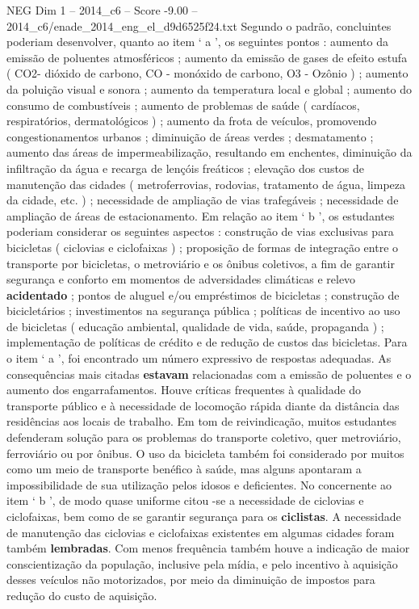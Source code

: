 \begin{textsample}{NEG Dim 1 – 2014\_c6 – Score -9.00 – 2014\_c6/enade\_2014\_eng\_el\_d9d6525f24.txt}
Segundo o padrão, concluintes poderiam desenvolver, quanto ao item ‘ a ’, os seguintes pontos : aumento da emissão de poluentes atmosféricos ; aumento da emissão de gases de efeito estufa ( CO2- dióxido de carbono, CO - monóxido de carbono, O3 - Ozônio ) ; aumento da poluição visual e sonora ; aumento da temperatura local e global ; aumento do consumo de combustíveis ; aumento de problemas de saúde ( cardíacos, respiratórios, dermatológicos ) ; aumento da frota de veículos, promovendo congestionamentos urbanos ; diminuição de áreas verdes ; desmatamento ; aumento das áreas de impermeabilização, resultando em enchentes, diminuição da infiltração da água e recarga de lençóis freáticos ; elevação dos custos de manutenção das cidades ( metroferrovias, rodovias, tratamento de água, limpeza da cidade, etc. ) ; necessidade de ampliação de vias trafegáveis ; necessidade de ampliação de áreas de estacionamento.
Em relação ao item ‘ b ’, os estudantes poderiam considerar os seguintes aspectos : construção de vias exclusivas para bicicletas ( ciclovias e ciclofaixas ) ; proposição de formas de integração entre o transporte por bicicletas, o metroviário e os ônibus coletivos, a fim de garantir segurança e conforto em momentos de adversidades climáticas e relevo \textbf{acidentado} ; pontos de aluguel e/ou empréstimos de bicicletas ; construção de bicicletários ; investimentos na segurança pública ; políticas de incentivo ao uso de bicicletas ( educação ambiental, qualidade de vida, saúde, propaganda ) ; implementação de políticas de crédito e de redução de custos das bicicletas.
Para o item ‘ a ’, foi encontrado um número expressivo de respostas adequadas.
As consequências mais citadas \textbf{estavam} relacionadas com a emissão de poluentes e o aumento dos engarrafamentos.
Houve críticas frequentes à qualidade do transporte público e à necessidade de locomoção rápida diante da distância das residências aos locais de trabalho.
Em tom de reivindicação, muitos estudantes defenderam solução para os problemas do transporte coletivo, quer metroviário, ferroviário ou por ônibus.
O uso da bicicleta também foi considerado por muitos como um meio de transporte benéfico à saúde, mas alguns apontaram a impossibilidade de sua utilização pelos idosos e deficientes.
No concernente ao item ‘ b ’, de modo quase uniforme citou -se a necessidade de ciclovias e ciclofaixas, bem como de se garantir segurança para os \textbf{ciclistas}.
A necessidade de manutenção das ciclovias e ciclofaixas existentes em algumas cidades foram também \textbf{lembradas}.
Com menos frequência também houve a indicação de maior conscientização da população, inclusive pela mídia, e pelo incentivo à aquisição desses veículos não motorizados, por meio da diminuição de impostos para redução do custo de aquisição.

\end{textsample}
